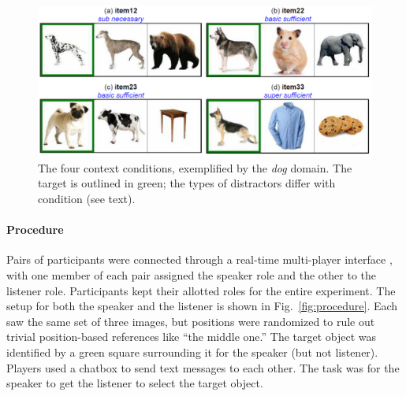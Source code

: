\documentclass[10pt,letterpaper]{article}
\newcommand{\ndg}[1]{\textcolor{Green}{[ndg: #1]}}
\newcommand{\figref}[1]{Fig.~\ref{#1}}
\begin{document}
\begin{figure}[bt!]
\centering
\includegraphics[width=.5\textwidth]{graphs/design}
\caption{The four context conditions, exemplified by the \textit{dog} domain. The target is outlined in green; the types of distractors differ with condition (see text).
}
\label{fig:design}
\end{figure}

\paragraph{Procedure}
Pairs of participants were connected through a real-time multi-player interface \cite{Hawkins15_RealTimeWebExperiments}, with one member of each pair assigned the speaker role and the other to the listener role. Participants kept their allotted roles for the entire experiment. 
The setup for both the speaker and the listener is shown in \figref{fig:procedure}. Each saw the same set of three images, but positions were randomized to rule out trivial position-based references like ``the middle one.'' The target object was identified by a green square surrounding it for the speaker (but not listener). Players used a chatbox to send text messages to each other. The task was for the speaker to get the listener to select the target object. %
\end{document}
